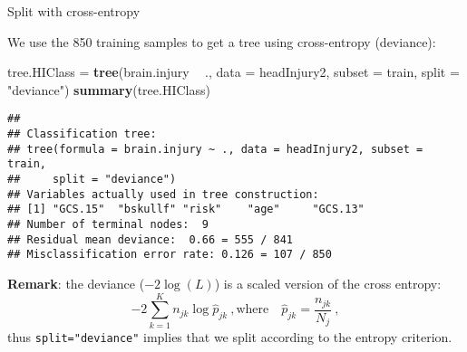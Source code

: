 \documentclass[10pt,ignorenonframetext,]{beamer}
\newenvironment{Shaded}{\begin{snugshade}}{\end{snugshade}}
\newcommand{\DataTypeTok}[1]{\textcolor[rgb]{0.13,0.29,0.53}{#1}}
\newcommand{\KeywordTok}[1]{\textcolor[rgb]{0.13,0.29,0.53}{\textbf{#1}}}
\newcommand{\NormalTok}[1]{#1}
\newcommand{\OperatorTok}[1]{\textcolor[rgb]{0.81,0.36,0.00}{\textbf{#1}}}
\newcommand{\StringTok}[1]{\textcolor[rgb]{0.31,0.60,0.02}{#1}}
\begin{document}
\begin{frame}[fragile]

\begin{block}{Split with cross-entropy}

\vspace{1mm}

We use the 850 training samples to get a tree using cross-entropy
(deviance):

\scriptsize

\begin{Shaded}
\begin{Highlighting}[]
\NormalTok{tree.HIClass =}\StringTok{ }\KeywordTok{tree}\NormalTok{(brain.injury }\OperatorTok{~}\StringTok{ }\NormalTok{., }\DataTypeTok{data =}\NormalTok{ headInjury2, }\DataTypeTok{subset =}\NormalTok{ train, }
    \DataTypeTok{split =} \StringTok{"deviance"}\NormalTok{)}
\KeywordTok{summary}\NormalTok{(tree.HIClass)}
\end{Highlighting}
\end{Shaded}

\begin{verbatim}
## 
## Classification tree:
## tree(formula = brain.injury ~ ., data = headInjury2, subset = train, 
##     split = "deviance")
## Variables actually used in tree construction:
## [1] "GCS.15"  "bskullf" "risk"    "age"     "GCS.13" 
## Number of terminal nodes:  9 
## Residual mean deviance:  0.66 = 555 / 841 
## Misclassification error rate: 0.126 = 107 / 850
\end{verbatim}

\vspace{6mm}

\textbf{Remark}: the deviance (\(-2\log(L)\)) is a scaled version of the
cross entropy:
\[-2\sum_{k=1}^K n_{jk} \log\hat{p}_{jk}\ , \text{where} \quad   \hat{p}_{jk}=\frac{n_{jk}}{N_j}\ , \]
thus \texttt{split="deviance"} implies that we split according to the
entropy criterion.

\end{block}

\end{frame}
\end{document}
